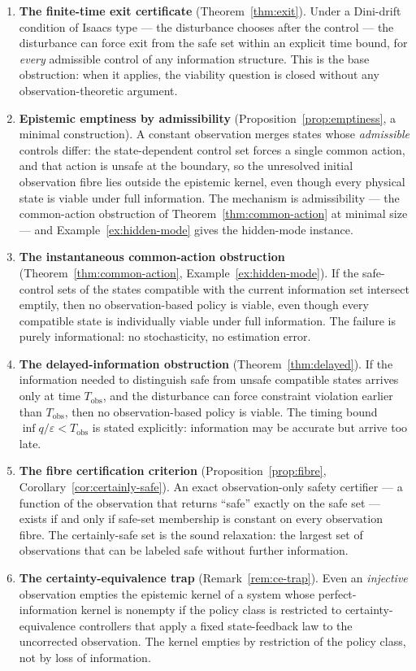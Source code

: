 \documentclass[11pt]{article}
\theoremstyle{definition}
\begin{document}
\begin{enumerate}
\def\labelenumi{\arabic{enumi}.}
\item
  \textbf{The finite-time exit certificate} (Theorem~\ref{thm:exit}). Under a
  Dini-drift condition of Isaacs type --- the disturbance chooses after
  the control --- the disturbance can force exit from the safe set
  within an explicit time bound, for \emph{every} admissible control of
  any information structure. This is the base obstruction: when it
  applies, the viability question is closed without any
  observation-theoretic argument.
\item
  \textbf{Epistemic emptiness by admissibility} (Proposition~\ref{prop:emptiness}, a minimal
  construction). A constant observation merges states whose
  \emph{admissible} controls differ: the state-dependent control set
  forces a single common action, and that action is unsafe at the
  boundary, so the unresolved initial observation fibre lies outside the
  epistemic kernel, even though every physical state is viable under
  full information. The mechanism is admissibility --- the common-action
  obstruction of Theorem~\ref{thm:common-action} at minimal size --- and Example~\ref{ex:hidden-mode} gives the hidden-mode instance.
\item
  \textbf{The instantaneous common-action obstruction} (Theorem~\ref{thm:common-action},
  Example~\ref{ex:hidden-mode}). If the safe-control sets of the states compatible with the
  current information set intersect emptily, then no observation-based
  policy is viable, even though every compatible state is individually
  viable under full information. The failure is purely informational: no
  stochasticity, no estimation error.
\item
  \textbf{The delayed-information obstruction} (Theorem~\ref{thm:delayed}). If the
  information needed to distinguish safe from unsafe compatible states
  arrives only at time \(T_{\mathrm{obs}}\), and the disturbance can
  force constraint violation earlier than \(T_{\mathrm{obs}}\), then no
  observation-based policy is viable. The timing bound
  \(\inf q / \varepsilon < T_{\mathrm{obs}}\) is stated explicitly:
  information may be accurate but arrive too late.
\item
  \textbf{The fibre certification criterion} (Proposition~\ref{prop:fibre}, Corollary~\ref{cor:certainly-safe}).
  An exact observation-only safety certifier --- a function of the
  observation that returns ``safe'' exactly on the safe set --- exists
  if and only if safe-set membership is constant on every observation
  fibre. The certainly-safe set is the sound relaxation: the largest set
  of observations that can be labeled safe without further information.
\item
  \textbf{The certainty-equivalence trap} (Remark~\ref{rem:ce-trap}). Even an
  \emph{injective} observation empties the epistemic kernel of a system
  whose perfect-information kernel is nonempty if the policy class is
  restricted to certainty-equivalence controllers that apply a fixed
  state-feedback law to the uncorrected observation. The kernel empties
  by restriction of the policy class, not by loss of information.
\end{enumerate}
\end{document}
